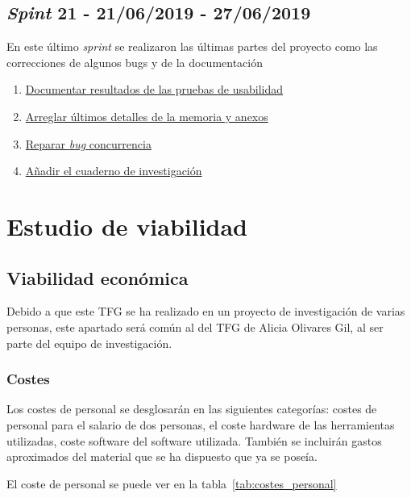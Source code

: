\subsection{\textit{Spint} 21 - 21/06/2019 - 27/06/2019}
En este último \textit{sprint} se realizaron las últimas partes del proyecto como las correcciones de algunos bugs y de la documentación

\begin{enumerate}\addtocounter{enumi}{105}
	\item 
	\href{https://github.com/jlgarridol/TFG-SmartBeds/issues/106}{Documentar resultados de las pruebas de usabilidad}
	\item 
	\href{https://github.com/jlgarridol/TFG-SmartBeds/issues/107}{Arreglar últimos detalles de la memoria y anexos}
	\item 
	\href{https://github.com/jlgarridol/TFG-SmartBeds/issues/108}{Reparar \textit{bug} concurrencia}
	\item 
	\href{https://github.com/jlgarridol/TFG-SmartBeds/issues/109}{Añadir el cuaderno de investigación}
\end{enumerate}

\section{Estudio de viabilidad}

\subsection{Viabilidad económica}

Debido a que este TFG se ha realizado en un proyecto de investigación de varias personas, este apartado será común al del TFG de Alicia Olivares Gil, al ser parte del equipo de investigación.

\subsubsection{Costes}

Los costes de personal se desglosarán en las siguientes categorías: costes de personal para el salario de dos personas, el coste hardware de las herramientas utilizadas, coste software del software utilizada. También se incluirán gastos aproximados del material que se ha dispuesto que ya se poseía.

El coste de personal se puede ver en la tabla~\ref{tab:costes_personal}
 
